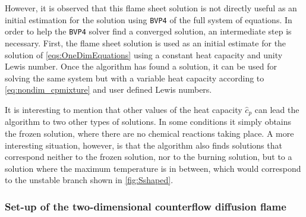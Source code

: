However, it is observed that this flame sheet solution is not directly useful as an initial estimation for the solution using  \lstinline|BVP4| of the full system of equations. In order to help  the \lstinline|BVP4| solver find a converged solution, an intermediate step is necessary. First, the flame sheet solution is used as an initial estimate for the solution of  \cref{eqs:OneDimEquations} using a constant heat capacity and unity Lewis number. Once the algorithm has found a solution, it can be used for solving the same system but with a variable heat capacity according to \cref{eq:nondim_cpmixture} and user defined Lewis numbers.

It is interesting to mention that other values of the heat capacity $\hat c_p$ can lead the algorithm to two other types of solutions. In some conditions it simply obtains the frozen solution, where there are no chemical reactions taking place. A more interesting situation, however, is that the algorithm also finds solutions that correspond neither to the frozen solution, nor to the burning solution, but to a solution where the maximum temperature is in between, which would correspond to the unstable branch shown in \cref{fig:Sshaped}.
\subsubsection{Set-up of the two-dimensional counterflow diffusion flame}

